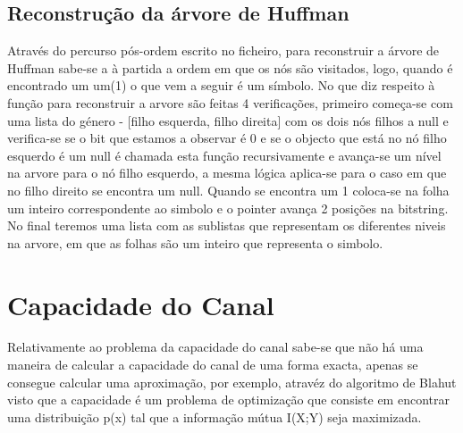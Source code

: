 \subsection{Reconstrução da árvore de Huffman}

\FloatBarrier
Através do percurso pós-ordem escrito no ficheiro, para reconstruir a árvore de Huffman sabe-se a à partida a ordem em que os nós são visitados, logo, quando é encontrado um um(1) o que vem a seguir é um símbolo. No que diz respeito à função para reconstruir a arvore são feitas 4 verificações, primeiro começa-se com uma lista do género - [filho esquerda, filho direita] com os dois nós filhos a null e verifica-se se o bit que estamos a observar é 0 e se o objecto que está no nó filho esquerdo é um null é chamada esta função recursivamente e avança-se um nível na arvore para o nó filho esquerdo, a mesma lógica aplica-se para o caso em que no filho direito se encontra um null. Quando se encontra um 1 coloca-se na folha um inteiro correspondente ao simbolo e o pointer avança 2 posições na bitstring. No final teremos uma lista com as sublistas que representam os diferentes niveis na arvore, em que as folhas são um inteiro que representa o simbolo.

\section{Capacidade do Canal}

Relativamente ao problema da capacidade do canal sabe-se que não há uma maneira de calcular a capacidade do canal de uma forma exacta, apenas se consegue calcular uma aproximação, por exemplo, atravéz do algoritmo de Blahut visto que a capacidade é um problema de optimização que consiste em encontrar uma distribuição p(x) tal que a informação mútua I(X;Y) seja maximizada.

